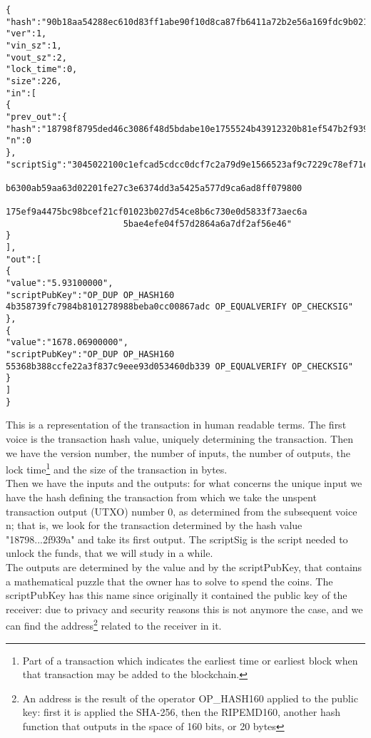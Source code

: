 \begin{lstlisting}[frame=single]
{
"hash":"90b18aa54288ec610d83ff1abe90f10d8ca87fb6411a72b2e56a169fdc9b0219",
"ver":1,
"vin_sz":1,
"vout_sz":2,
"lock_time":0,
"size":226,
"in":[
{
"prev_out":{
"hash":"18798f8795ded46c3086f48d5bdabe10e1755524b43912320b81ef547b2f939a",
"n":0
},
"scriptSig":"3045022100c1efcad5cdcc0dcf7c2a79d9e1566523af9c7229c78ef71ee8 
					   b6300ab59aa63d02201fe27c3e6374dd3a5425a577d9ca6ad8ff079800
					   175ef9a4475bc98bcef21cf01023b027d54ce8b6c730e0d5833f73aec6a
					   5bae4efe04f57d2864a6a7df2af56e46"
}
],
"out":[
{
"value":"5.93100000",
"scriptPubKey":"OP_DUP OP_HASH160 4b358739fc7984b8101278988beba0cc00867adc OP_EQUALVERIFY OP_CHECKSIG"
},
{
"value":"1678.06900000",
"scriptPubKey":"OP_DUP OP_HASH160 55368b388ccfe22a3f837c9eee93d053460db339 OP_EQUALVERIFY OP_CHECKSIG"
}
]
}
\end{lstlisting}
This is a representation of the transaction in human readable terms. The first voice is the transaction hash value, uniquely determining the transaction. Then we have the version number, the number of inputs, the number of outputs, the lock time\footnote{Part of a transaction which indicates the earliest time or earliest block when that transaction may be added to the blockchain.} and the size of the transaction in bytes.
\\
Then we have the inputs and the outputs: for what concerns the unique input we have the hash defining the transaction from which we take the unspent transaction output (UTXO) number 0, as determined from the subsequent voice n; that is, we look for the transaction determined by the hash value "18798...2f939a" and take its first output. The scriptSig is the script needed to unlock the funds, that we will study in a while.
\\
The outputs are determined by the value and by the scriptPubKey, that contains a mathematical puzzle that the owner has to solve to spend the coins. The scriptPubKey has this name since originally it contained the public key of the receiver: due to privacy and security reasons this is not anymore the case, and we can find the address\footnote{An address is the result of the operator OP\_HASH160 applied to the public key: first it is applied the SHA-256, then the RIPEMD160, another hash function that outputs in the space of 160 bits, or 20 bytes} related to the receiver in it. 

